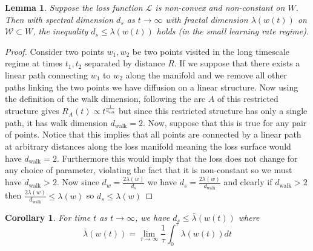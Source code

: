 \documentclass{article} %
\newtheorem*{lemma*}{Lemma}
\newtheorem*{corollary*}{Corollary}
\theoremstyle{definition}
\begin{document}
\begin{lemma*}
Suppose the loss function $\mathcal{L}$ is non-convex and non-constant on $W$. Then with spectral dimension $d_s$ as $t \to \infty$ with fractal dimension $\lambda(w(t))$ on $\mathcal{W} \subset W$, the inequality $d_s \leq \lambda(w(t))$ holds (in the small learning rate regime).
\end{lemma*}
\begin{proof}
    Consider two points $w_1, w_2$ be two points visited in the long timescale regime at times $t_1, t_2$ separated by distance $R$. If we suppose that there exists a linear path connecting $w_1$ to $w_2$ along the manifold and we remove all other paths linking the two points we have diffusion on a linear structure. Now using the definition of the walk dimension, following the arc $A$ of this restricted structure gives $R_A(t) \propto t^\frac{1}{d_{\text{walk}}}$ but since this restricted structure has only a single path, it has walk dimension $d_\text{walk} = 2$. Now, suppose that this is true for any pair of points. Notice that this implies that all points are connected by a linear path at arbitrary distances along the loss manifold meaning the loss surface would have $d_{\text{walk}} = 2$. Furthermore this would imply that the loss does not change for any choice of parameter, violating the fact that it is non-constant so we must have $d_{\text{walk}}>2$. Now since $d_w = \frac{2\lambda(w)}{d_s}$ we have $d_s = \frac{2\lambda(w)}{d_{\text{walk}}}$ and clearly if $d_{\text{walk}}> 2$ then $\frac{2\lambda(w)}{d_{\text{walk}}} \leq \lambda(w)$ so $d_s \leq \lambda(w)$ 
\end{proof}
\begin{corollary*}
For time $t$ as $t \to \infty$, we have $d_s \leq \bar{\lambda}(w(t))$ where
    \begin{equation}
        \bar{\lambda}(w(t)) = \lim_{\tau \to \infty} \frac{1}{\tau} \int_0^\tau \lambda(w(t)) dt
    \end{equation}
\end{corollary*}
\end{document}
